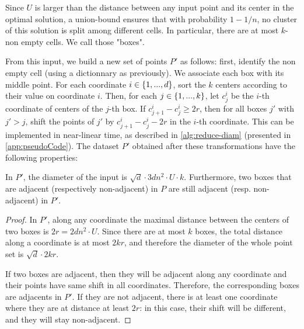 Since $U$ is larger than the distance between any input point and its center in the optimal solution, a union-bound ensures that with probability $1-1/n$, no
cluster of this solution is split among different cells.  In particular, there are at most $k$-non empty cells. We call those "boxes".

From this input, we build a new set of points $P'$ as follows: first, identify the non empty cell (using a dictionnary as previously). We associate each box with
its middle point.  For each coordinate $i \in \left\{ 1, ..., d \right\}$, sort the $k$ centers according to their value on coordinate $i$. Then, for
each $j \in \left\{ 1, ..., k\right\}$, let $c^i_j$  be the $i$-th coordinate of centers of the $j$-th box. If $c^i_{j+1} - c^i_j
\geq 2r$, then for all boxes $j'$ with $j' > j$, shift the points of $j'$ by $c^i_{j+1} - c^i_j - 2r$ in the $i$-th coordinate. This can be implemented in near-linear time, as described in \cref{alg:reduce-diam} (presented in \cref{app:pseudoCode}). The dataset $P'$ obtained after these transformations have the following properties:


\begin{proposition}\label{prop:boxes}
In $P'$, the diameter of the input is $\sqrt{d} \cdot 3d n^2\cdot U \cdot k$. 
Furthermore, two boxes that are adjacent (respectively non-adjacent) in $P$  are still adjacent (resp. non-adjacent) in $P'$.
\end{proposition}
\begin{proof}
In $P'$, along any
coordinate the maximal distance between the centers of two boxes is $2r = 2d n^2\cdot U$. Since there are at most $k$ boxes, the total distance along a coordinate is at most $2kr$, and therefore the diameter of the whole point set is $\sqrt{d} \cdot 2kr$.

If two boxes are adjacent, then they will be adjacent along any coordinate and their points have same shift in all coordinates. Therefore, the corresponding boxes are adjacents in $P'$. If they are not adjacent, there is at least one coordinate where they are at distance at least $2r$: in this case, their shift will be different, and they will stay non-adjacent.
\end{proof}


